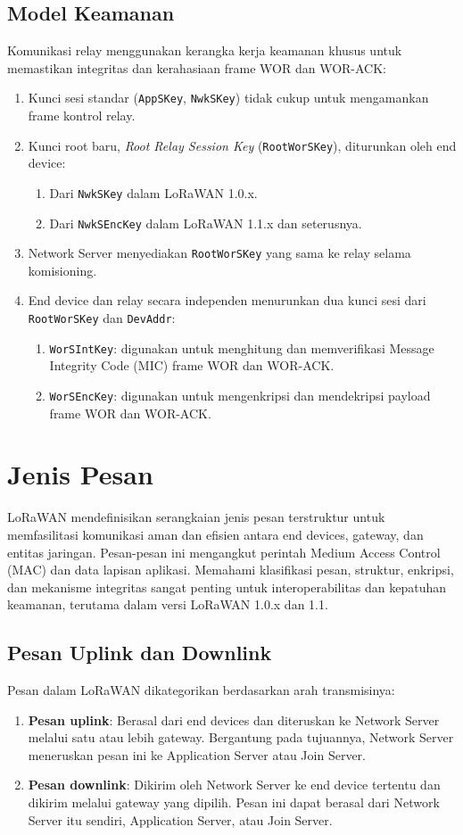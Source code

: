 \subsection{Model Keamanan}
Komunikasi relay menggunakan kerangka kerja keamanan khusus untuk memastikan integritas dan kerahasiaan frame WOR dan WOR-ACK:
\begin{enumerate}
    \item Kunci sesi standar (\texttt{AppSKey}, \texttt{NwkSKey}) tidak cukup untuk mengamankan frame kontrol relay.
    \item Kunci root baru, \emph{Root Relay Session Key} (\texttt{RootWorSKey}), diturunkan oleh end device:
          \begin{enumerate}
              \item Dari \texttt{NwkSKey} dalam LoRaWAN 1.0.x.
              \item Dari \texttt{NwkSEncKey} dalam LoRaWAN 1.1.x dan seterusnya.
          \end{enumerate}
    \item Network Server menyediakan \texttt{RootWorSKey} yang sama ke relay selama komisioning.
    \item End device dan relay secara independen menurunkan dua kunci sesi dari \texttt{RootWorSKey} dan \texttt{DevAddr}:
          \begin{enumerate}
              \item \texttt{WorSIntKey}: digunakan untuk menghitung dan memverifikasi Message Integrity Code (MIC) frame WOR dan WOR-ACK.
              \item \texttt{WorSEncKey}: digunakan untuk mengenkripsi dan mendekripsi payload frame WOR dan WOR-ACK.
          \end{enumerate}
\end{enumerate}
\section{Jenis Pesan}
LoRaWAN mendefinisikan serangkaian jenis pesan terstruktur untuk memfasilitasi komunikasi aman dan efisien antara end devices, gateway, dan entitas jaringan. Pesan-pesan ini mengangkut perintah Medium Access Control (MAC) dan data lapisan aplikasi. Memahami klasifikasi pesan, struktur, enkripsi, dan mekanisme integritas sangat penting untuk interoperabilitas dan kepatuhan keamanan, terutama dalam versi LoRaWAN 1.0.x dan 1.1.
\subsection{Pesan Uplink dan Downlink}
Pesan dalam LoRaWAN dikategorikan berdasarkan arah transmisinya:
\begin{enumerate}
    \item \textbf{Pesan uplink}: Berasal dari end devices dan diteruskan ke Network Server melalui satu atau lebih gateway. Bergantung pada tujuannya, Network Server meneruskan pesan ini ke Application Server atau Join Server.
    \item \textbf{Pesan downlink}: Dikirim oleh Network Server ke end device tertentu dan dikirim melalui gateway yang dipilih. Pesan ini dapat berasal dari Network Server itu sendiri, Application Server, atau Join Server.
\end{enumerate}
